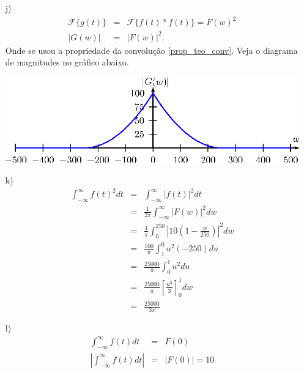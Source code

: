 \begin{resp}
\begin{itemize}
    \item[j)] 
    \begin{eqnarray*}
    \mathcal{F}\{g(t)\}&=&\mathcal{F}\{f(t)\ast f(t)\}=F(w)^2 \\
    |G(w)|&=&|F(w)|^2.
    \end{eqnarray*}
    Onde se usou a propriedade da convolução  \ref{prop_teo_conv}. Veja o diagrama de magnitudes no gráfico abaixo.
    \begin{center}
    \includegraphics{cap_propriedades_transformada/pics/figura_20}\end{center}
    \item[k)] 
    \begin{eqnarray*}
    \int_{-\infty}^\infty f(t)^2dt&=&\int_{-\infty}^\infty |f(t)|^2dt\\
    &=&\frac{1}{2\pi}\int_{-\infty}^\infty |F(w)|^2dw\\
    &=&\frac{1}{\pi}\int_{0}^{250} \left|10\left(1-\frac{w}{250}\right)\right|^2dw\\
    &=&\frac{100}{\pi}\int_{1}^{0}  u^2\left(-250\right)du\\
    &=&\frac{25000}{\pi}\int_{0}^{1}  u^2du\\
    &=&\frac{25000}{\pi}\left[\frac{u^3}{3}\right]_{0}^{1}dw\\
    &=&\frac{25000}{3\pi}
    \end{eqnarray*}
    \item[l)] 
    \begin{eqnarray*}
    \int_{-\infty}^\infty f(t)dt&=& F(0)\\
    \left|\int_{-\infty}^\infty f(t)dt\right|&=& |F(0)|=10
    \end{eqnarray*}
    \end{itemize}
    \end{resp}
    

